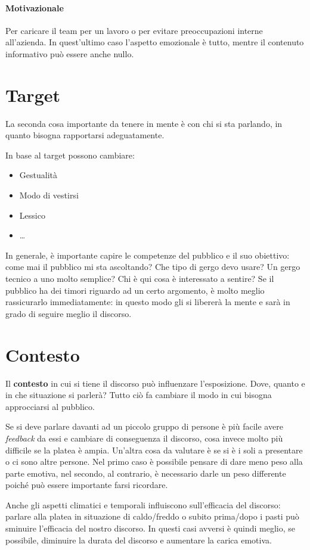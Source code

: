 \paragraph*{Motivazionale} Per caricare il team per un lavoro o per evitare
preoccupazioni interne all'azienda. In quest'ultimo caso l'aspetto emozionale è
tutto, mentre il contenuto informativo può essere anche nullo.

\section{Target}
La seconda cosa importante da tenere in mente è con chi si sta parlando, in
quanto bisogna rapportarsi adeguatamente.

In base al target possono cambiare:
\begin{itemize}
 \item Gestualità
 \item Modo di vestirsi
 \item Lessico
 \item \dots
\end{itemize}

In generale, è importante capire le competenze del pubblico e il suo obiettivo:
come mai il pubblico mi sta ascoltando? Che tipo di gergo devo usare? Un gergo
tecnico a uno molto semplice? Chi è qui cosa è interessato a sentire? Se il
pubblico ha dei timori riguardo ad un certo argomento, è molto meglio
rassicurarlo immediatamente: in questo modo gli si libererà la mente e sarà in
grado di seguire meglio il discorso.

\section{Contesto}

Il \textbf{contesto} in cui si tiene il discorso può influenzare l'esposizione.
Dove, quanto e in che situazione si parlerà?
Tutto ciò fa cambiare il modo in cui bisogna approcciarsi al pubblico.

Se si deve parlare davanti ad un piccolo gruppo di persone è più facile avere
\emph{feedback} da essi e cambiare di conseguenza il discorso, cosa invece
molto più difficile se la platea è ampia. Un'altra cosa da valutare è se si è
i soli a presentare o ci sono altre persone. Nel primo caso è possibile pensare
di dare meno peso alla parte emotiva, nel secondo, al contrario, è necessario
darle un peso differente poiché può essere importante farsi ricordare.

Anche gli aspetti climatici e temporali influiscono sull'efficacia del
discorso: parlare alla platea in situazione di caldo/freddo o subito prima/dopo
i pasti può sminuire l'efficacia del nostro discorso. In questi casi avversi è
quindi meglio, se possibile, diminuire la durata del discorso e aumentare la
carica emotiva.

